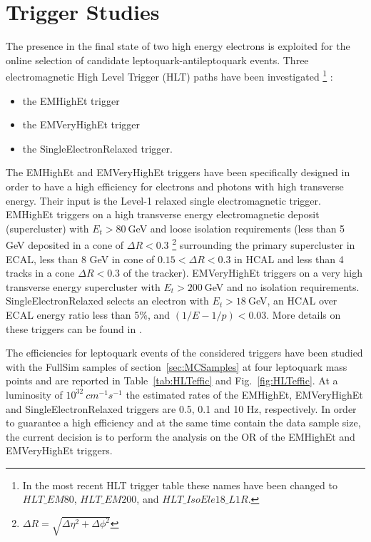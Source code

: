 %
\section{Trigger Studies} \label{sec:trig}

The presence in the final state of two high energy electrons is exploited for the online selection 
of candidate leptoquark-antileptoquark events. 
Three electromagnetic High Level Trigger (HLT) paths have been investigated
 \footnote{In the most recent HLT trigger table these names have been changed to $HLT\_EM80$, $HLT\_EM200$, 
and $HLT\_IsoEle18\_L1R$.}
:
\begin{itemize}
\item the EMHighEt trigger 
\item the EMVeryHighEt  trigger
\item the SingleElectronRelaxed trigger.
\end{itemize}

The EMHighEt and EMVeryHighEt triggers have been specifically designed in order to have a high 
efficiency for electrons and photons with high transverse energy. 
Their input is the Level-1 relaxed single electromagnetic trigger.
EMHighEt triggers on a high transverse energy electromagnetic deposit (supercluster) with
$E_t>80~$GeV and loose isolation requirements (less than 5 GeV deposited in a 
cone of $\Delta R<0.3$ \footnote{$\Delta R=\sqrt{\Delta\eta^2 + \Delta\phi ^2}$} surrounding the 
primary supercluster in ECAL, less than 
8 GeV in cone of $0.15<\Delta R<0.3$ in HCAL and less than 4 tracks in a cone $\Delta R<0.3$ of the tracker).
EMVeryHighEt triggers on a very high transverse energy supercluster with $E_t>200~$GeV and no isolation 
requirements. SingleElectronRelaxed selects an electron with $E_t>18~$GeV, an HCAL over ECAL energy ratio less than 5\%, 
and $(1/E-1/p)<0.03$. More details on these triggers can be found in \cite{HeepHlt}.

The efficiencies for leptoquark events of the considered triggers have been studied with the FullSim 
samples of section~\ref{sec:MCSamples} at four leptoquark mass points and are reported in Table~\ref{tab:HLTeffic} and 
Fig.~\ref{fig:HLTeffic}.
At a luminosity of $10^{32}~cm^{-1}s^{-1}$ the estimated rates of the EMHighEt, EMVeryHighEt and SingleElectronRelaxed triggers 
are 0.5, 0.1 and 10 Hz, respectively.
In order to guarantee a high efficiency and at the same time contain the data sample size, the current decision is to perform 
the analysis on the OR of the EMHighEt and EMVeryHighEt triggers.


